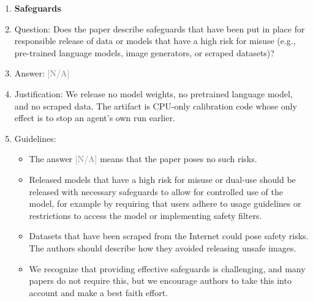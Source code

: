 \documentclass{article}
\providecommand{\answerNA}[1][]{\textcolor{gray}{[N/A] #1}}
\begin{document}
\begin{enumerate}
\item {\bf Safeguards}
    \item[] Question: Does the paper describe safeguards that have been put in place for responsible release of data or models that have a high risk for misuse (e.g., pre-trained language models, image generators, or scraped datasets)?
    \item[] Answer: \answerNA{}
    \item[] Justification: We release no model weights, no pretrained language model, and no scraped data. The artifact is CPU-only calibration code whose only effect is to stop an agent's own run earlier.
    \item[] Guidelines:
    \begin{itemize}
        \item The answer \answerNA{} means that the paper poses no such risks.
        \item Released models that have a high risk for misuse or dual-use should be released with necessary safeguards to allow for controlled use of the model, for example by requiring that users adhere to usage guidelines or restrictions to access the model or implementing safety filters.
        \item Datasets that have been scraped from the Internet could pose safety risks. The authors should describe how they avoided releasing unsafe images.
        \item We recognize that providing effective safeguards is challenging, and many papers do not require this, but we encourage authors to take this into account and make a best faith effort.
    \end{itemize}


\end{enumerate}
\end{document}
